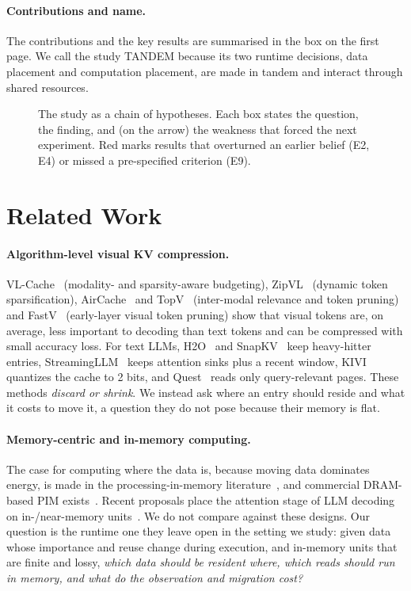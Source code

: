 \documentclass[10pt,a4paper]{article}
\begin{document}
\paragraph{Contributions and name.} The contributions and the key results are summarised in the box on the first page. We call the study TANDEM because its two runtime decisions, data placement and computation placement, are made in tandem and interact through shared resources.

\begin{figure}[t]
\centering

\caption{The study as a chain of hypotheses. Each box states the question, the finding, and (on the arrow) the weakness that forced the next experiment. Red marks results that overturned an earlier belief (E2, E4) or missed a pre-specified criterion (E9).}
\label{fig:roadmap}
\end{figure}

\section{Related Work}
\paragraph{Algorithm-level visual KV compression.} VL-Cache~\cite{vlcache} (modality- and sparsity-aware budgeting), ZipVL~\cite{zipvl} (dynamic token sparsification), AirCache~\cite{aircache} and TopV~\cite{topv} (inter-modal relevance and token pruning) and FastV~\cite{fastv} (early-layer visual token pruning) show that visual tokens are, on average, less important to decoding than text tokens and can be compressed with small accuracy loss. For text LLMs, H2O~\cite{h2o} and SnapKV~\cite{snapkv} keep heavy-hitter entries, StreamingLLM~\cite{streaming} keeps attention sinks plus a recent window, KIVI~\cite{kivi} quantizes the cache to 2 bits, and Quest~\cite{quest} reads only query-relevant pages. These methods \emph{discard or shrink}. We instead ask where an entry should reside and what it costs to move it, a question they do not pose because their memory is flat.

\paragraph{Memory-centric and in-memory computing.} The case for computing where the data is, because moving data dominates energy, is made in the processing-in-memory literature~\cite{mutlu19}, and commercial DRAM-based PIM exists~\cite{hbmpim}. Recent proposals place the attention stage of LLM decoding on in-/near-memory units~\cite{attacc,neupims}. We do not compare against these designs. Our question is the runtime one they leave open in the setting we study: given data whose importance and reuse change during execution, and in-memory units that are finite and lossy, \emph{which data should be resident where, which reads should run in memory, and what do the observation and migration cost?}
\end{document}
